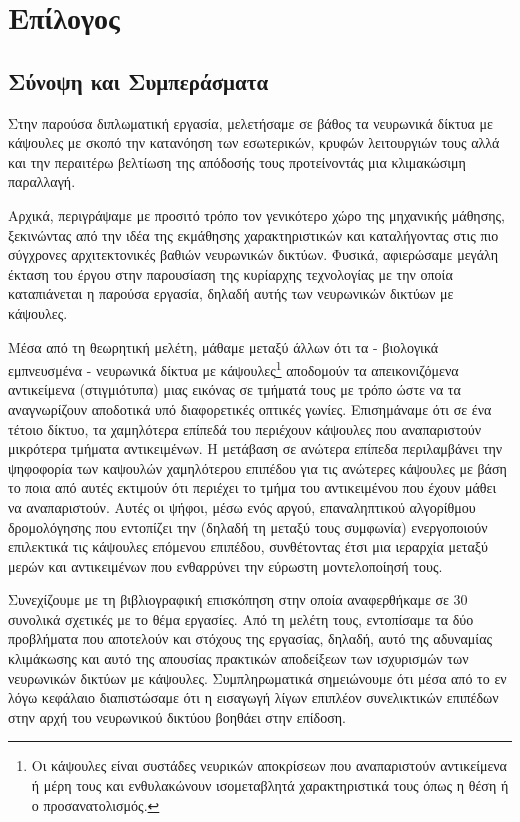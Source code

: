 \chapter{Επίλογος}

\section{Σύνοψη και Συμπεράσματα}

Στην παρούσα διπλωματική εργασία, μελετήσαμε σε βάθος τα νευρωνικά δίκτυα με κάψουλες με σκοπό την κατανόηση των εσωτερικών, κρυφών λειτουργιών τους αλλά και την περαιτέρω βελτίωση της απόδοσής τους προτείνοντάς μια κλιμακώσιμη παραλλαγή.\par

Αρχικά, περιγράψαμε με προσιτό τρόπο τον γενικότερο χώρο της μηχανικής μάθησης, ξεκινώντας από την ιδέα της εκμάθησης χαρακτηριστικών και καταλήγοντας στις πιο σύγχρονες αρχιτεκτονικές βαθιών νευρωνικών δικτύων. Φυσικά, αφιερώσαμε μεγάλη έκταση του έργου στην παρουσίαση της κυρίαρχης τεχνολογίας με την οποία καταπιάνεται η παρούσα εργασία, δηλαδή αυτής των νευρωνικών δικτύων με κάψουλες.\par

Μέσα από τη θεωρητική μελέτη, μάθαμε μεταξύ άλλων ότι τα - βιολογικά εμπνευσμένα - νευρωνικά δίκτυα με κάψουλες\footnote{Οι κάψουλες είναι συστάδες νευρικών αποκρίσεων που αναπαριστούν αντικείμενα ή μέρη τους και ενθυλακώνουν ισομεταβλητά χαρακτηριστικά τους όπως η θέση ή ο προσανατολισμός.} αποδομούν τα απεικονιζόμενα αντικείμενα (στιγμιότυπα) μιας εικόνας σε τμήματά τους με τρόπο ώστε να τα αναγνωρίζουν αποδοτικά υπό διαφορετικές οπτικές γωνίες. Επισημάναμε ότι σε ένα τέτοιο δίκτυο, τα χαμηλότερα επίπεδά του περιέχουν κάψουλες που αναπαριστούν μικρότερα τμήματα αντικειμένων. Η μετάβαση σε ανώτερα επίπεδα περιλαμβάνει την ψηφοφορία των καψουλών χαμηλότερου επιπέδου για τις ανώτερες κάψουλες με βάση το ποια από αυτές εκτιμούν ότι περιέχει το τμήμα του αντικειμένου που έχουν μάθει να αναπαριστούν. Αυτές οι ψήφοι, μέσω ενός αργού, επαναληπτικού αλγορίθμου δρομολόγησης που εντοπίζει την  (δηλαδή τη μεταξύ τους συμφωνία) ενεργοποιούν επιλεκτικά τις κάψουλες επόμενου επιπέδου, συνθέτοντας έτσι μια ιεραρχία μεταξύ μερών και αντικειμένων που ενθαρρύνει την εύρωστη μοντελοποίησή τους.\par

Συνεχίζουμε με τη βιβλιογραφική επισκόπηση στην οποία αναφερθήκαμε σε 30 συνολικά σχετικές με το θέμα εργασίες. Από τη μελέτη τους, εντοπίσαμε τα δύο προβλήματα που αποτελούν και στόχους της εργασίας, δηλαδή, αυτό της αδυναμίας κλιμάκωσης και αυτό της απουσίας πρακτικών αποδείξεων  των ισχυρισμών των νευρωνικών δικτύων με κάψουλες. Συμπληρωματικά σημειώνουμε ότι μέσα από το εν λόγω κεφάλαιο διαπιστώσαμε ότι η εισαγωγή λίγων επιπλέον συνελικτικών επιπέδων στην αρχή του νευρωνικού δικτύου βοηθάει στην επίδοση.\par

